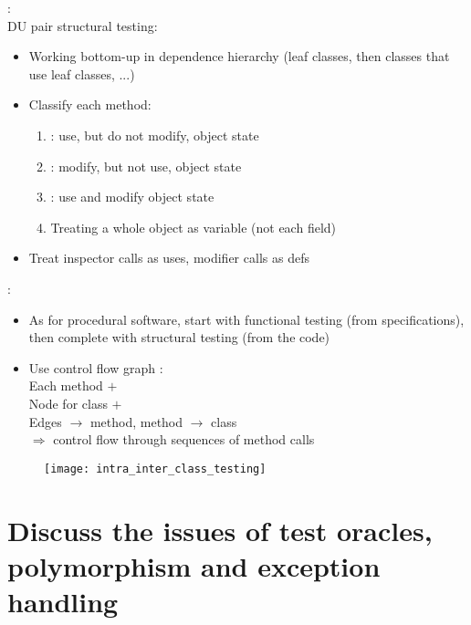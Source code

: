\begin{minipage}[t]{0.48\textwidth} 
     :\\
    DU pair structural testing:
    \begin{itemize}
        \item Working bottom-up in dependence hierarchy (leaf classes, then classes that use leaf classes, ...)
        \item Classify each method:
        \begin{enumerate}
            \item {} : use, but do not modify, object state
            \item {} : modify, but not use, object state
            \item {} : use and modify object state
            \item Treating a whole object as variable (not each field)
        \end{enumerate}
        \item Treat inspector calls as uses, modifier calls as defs
    \end{itemize}
\end{minipage}
\hfill
\begin{minipage}[t]{0.48\textwidth}
     :
    \begin{itemize}
        \item As for procedural software, start with functional testing (from specifications), then complete with structural testing (from the code)
        \item Use control flow graph :\\
        Each method $+$\\
        Node for class $+$\\
        Edges $\rightarrow$ method, method $\rightarrow$ class\\
        $\Rightarrow$ control flow through sequences of method calls
    \end{itemize}
\end{minipage}

\begin{figure}[H]
    \centering
    \texttt{[image: intra\_inter\_class\_testing]}
\end{figure}

\section{Discuss the issues of test oracles, polymorphism and exception handling}

